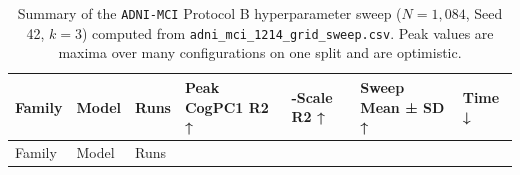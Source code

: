 \documentclass[
  10pt,
  letterpaper,
]{report}
\begin{document}
\begin{longtable}[]{@{}
  >{\raggedright\arraybackslash}p{}
  >{\raggedright\arraybackslash}p{}
  >{\raggedleft\arraybackslash}p{}
  >{\raggedleft\arraybackslash}p{}
  >{\raggedleft\arraybackslash}p{}
  >{\raggedleft\arraybackslash}p{}
  >{\raggedleft\arraybackslash}p{}@{}}
\caption{Summary of the \protect\texttt{ADNI-MCI} Protocol B
hyperparameter sweep (\(N = 1,084\), Seed 42, \(k = 3\)) computed from
\protect\texttt{adni\_mci\_1214\_grid\_sweep.csv}. Peak values are
maxima over many configurations on one split and are
optimistic.}\label{tbl-app-adni-sweep}\tabularnewline
\toprule\noalign{}
\begin{minipage}[b]{\linewidth}\raggedright
Family
\end{minipage} & \begin{minipage}[b]{\linewidth}\raggedright
Model
\end{minipage} & \begin{minipage}[b]{\linewidth}\raggedleft
Runs
\end{minipage} & \begin{minipage}[b]{\linewidth}\raggedleft
Peak CogPC1 R2 ↑
\end{minipage} & \begin{minipage}[b]{\linewidth}\raggedleft
11-Scale R2 ↑
\end{minipage} & \begin{minipage}[b]{\linewidth}\raggedleft
Sweep Mean ± SD ↑
\end{minipage} & \begin{minipage}[b]{\linewidth}\raggedleft
Time ↓
\end{minipage} \\
\midrule\noalign{}
\endfirsthead
\toprule\noalign{}
\begin{minipage}[b]{\linewidth}\raggedright
Family
\end{minipage} & \begin{minipage}[b]{\linewidth}\raggedright
Model
\end{minipage} & \begin{minipage}[b]{\linewidth}\raggedleft
Runs
\end{minipage} & \begin{minipage}[b]{\linewidth}\raggedleft

\end{minipage}
\end{longtable}
\end{document}
